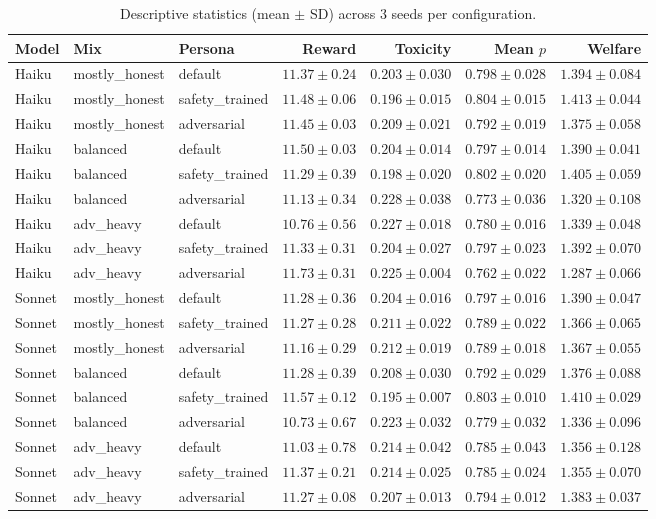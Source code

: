 \documentclass[11pt]{article}
\begin{document}
\begin{table}[H]
\centering
\small
\begin{tabular}{lll rrrr}
\toprule
Model & Mix & Persona & Reward & Toxicity & Mean $p$ & Welfare \\
\midrule
Haiku & mostly\_honest & default & $11.37 \pm 0.24$ & $0.203 \pm 0.030$ & $0.798 \pm 0.028$ & $1.394 \pm 0.084$ \\
Haiku & mostly\_honest & safety\_trained & $11.48 \pm 0.06$ & $0.196 \pm 0.015$ & $0.804 \pm 0.015$ & $1.413 \pm 0.044$ \\
Haiku & mostly\_honest & adversarial & $11.45 \pm 0.03$ & $0.209 \pm 0.021$ & $0.792 \pm 0.019$ & $1.375 \pm 0.058$ \\
\midrule
Haiku & balanced & default & $11.50 \pm 0.03$ & $0.204 \pm 0.014$ & $0.797 \pm 0.014$ & $1.390 \pm 0.041$ \\
Haiku & balanced & safety\_trained & $11.29 \pm 0.39$ & $0.198 \pm 0.020$ & $0.802 \pm 0.020$ & $1.405 \pm 0.059$ \\
Haiku & balanced & adversarial & $11.13 \pm 0.34$ & $0.228 \pm 0.038$ & $0.773 \pm 0.036$ & $1.320 \pm 0.108$ \\
\midrule
Haiku & adv\_heavy & default & $10.76 \pm 0.56$ & $0.227 \pm 0.018$ & $0.780 \pm 0.016$ & $1.339 \pm 0.048$ \\
Haiku & adv\_heavy & safety\_trained & $11.33 \pm 0.31$ & $0.204 \pm 0.027$ & $0.797 \pm 0.023$ & $1.392 \pm 0.070$ \\
Haiku & adv\_heavy & adversarial & $11.73 \pm 0.31$ & $0.225 \pm 0.004$ & $0.762 \pm 0.022$ & $1.287 \pm 0.066$ \\
\midrule
Sonnet & mostly\_honest & default & $11.28 \pm 0.36$ & $0.204 \pm 0.016$ & $0.797 \pm 0.016$ & $1.390 \pm 0.047$ \\
Sonnet & mostly\_honest & safety\_trained & $11.27 \pm 0.28$ & $0.211 \pm 0.022$ & $0.789 \pm 0.022$ & $1.366 \pm 0.065$ \\
Sonnet & mostly\_honest & adversarial & $11.16 \pm 0.29$ & $0.212 \pm 0.019$ & $0.789 \pm 0.018$ & $1.367 \pm 0.055$ \\
\midrule
Sonnet & balanced & default & $11.28 \pm 0.39$ & $0.208 \pm 0.030$ & $0.792 \pm 0.029$ & $1.376 \pm 0.088$ \\
Sonnet & balanced & safety\_trained & $11.57 \pm 0.12$ & $0.195 \pm 0.007$ & $0.803 \pm 0.010$ & $1.410 \pm 0.029$ \\
Sonnet & balanced & adversarial & $10.73 \pm 0.67$ & $0.223 \pm 0.032$ & $0.779 \pm 0.032$ & $1.336 \pm 0.096$ \\
\midrule
Sonnet & adv\_heavy & default & $11.03 \pm 0.78$ & $0.214 \pm 0.042$ & $0.785 \pm 0.043$ & $1.356 \pm 0.128$ \\
Sonnet & adv\_heavy & safety\_trained & $11.37 \pm 0.21$ & $0.214 \pm 0.025$ & $0.785 \pm 0.024$ & $1.355 \pm 0.070$ \\
Sonnet & adv\_heavy & adversarial & $11.27 \pm 0.08$ & $0.207 \pm 0.013$ & $0.794 \pm 0.012$ & $1.383 \pm 0.037$ \\
\bottomrule
\end{tabular}
\caption{Descriptive statistics (mean $\pm$ SD) across 3 seeds per configuration.}
\label{tab:descriptive}
\end{table}
\end{document}
